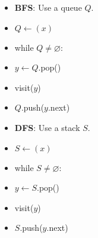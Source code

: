 \documentclass{standalone}
\let\emptyset\varnothing
\begin{document}
  \begin{minipage}{0.48\linewidth}
      \begin{itemize}\setlength{\itemsep}{-4pt}
      \item \textbf{BFS}: Use a queue $Q$.
      \item[] \quad $Q \gets (x)$
      \item[] \quad while $Q \neq \emptyset$:
      \item[] \quad \quad $y \gets Q$.pop()
      \item[] \quad \quad visit($y$)
      \item[] \quad \quad $Q$.push($y$.next)
      \end{itemize}
  \end{minipage}
  \hfill
  \begin{minipage}{0.48\linewidth}
      \begin{itemize}\setlength{\itemsep}{-4pt}
      \item \textbf{DFS}: Use a stack $S$.
      \item[] \quad $S \gets (x)$
      \item[] \quad while $S \neq \emptyset$:
      \item[] \quad \quad $y \gets S$.pop()
      \item[] \quad \quad visit($y$)
      \item[] \quad \quad $S$.push($y$.next)
      \end{itemize}
  \end{minipage}
\end{document}
